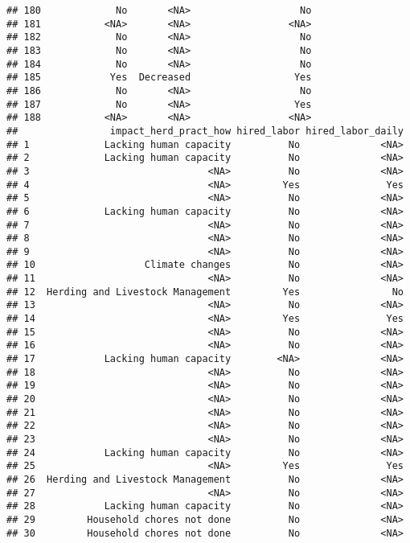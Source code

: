 \documentclass[
]{article}
\begin{document}
\begin{verbatim}
## 180             No       <NA>                   No
## 181           <NA>       <NA>                 <NA>
## 182             No       <NA>                   No
## 183             No       <NA>                   No
## 184             No       <NA>                   No
## 185            Yes  Decreased                  Yes
## 186             No       <NA>                   No
## 187             No       <NA>                  Yes
## 188           <NA>       <NA>                 <NA>
##                impact_herd_pract_how hired_labor hired_labor_daily
## 1             Lacking human capacity          No              <NA>
## 2             Lacking human capacity          No              <NA>
## 3                               <NA>          No              <NA>
## 4                               <NA>         Yes               Yes
## 5                               <NA>          No              <NA>
## 6             Lacking human capacity          No              <NA>
## 7                               <NA>          No              <NA>
## 8                               <NA>          No              <NA>
## 9                               <NA>          No              <NA>
## 10                   Climate changes          No              <NA>
## 11                              <NA>          No              <NA>
## 12  Herding and Livestock Management         Yes                No
## 13                              <NA>          No              <NA>
## 14                              <NA>         Yes               Yes
## 15                              <NA>          No              <NA>
## 16                              <NA>          No              <NA>
## 17            Lacking human capacity        <NA>              <NA>
## 18                              <NA>          No              <NA>
## 19                              <NA>          No              <NA>
## 20                              <NA>          No              <NA>
## 21                              <NA>          No              <NA>
## 22                              <NA>          No              <NA>
## 23                              <NA>          No              <NA>
## 24            Lacking human capacity          No              <NA>
## 25                              <NA>         Yes               Yes
## 26  Herding and Livestock Management          No              <NA>
## 27                              <NA>          No              <NA>
## 28            Lacking human capacity          No              <NA>
## 29         Household chores not done          No              <NA>
## 30         Household chores not done          No              <NA>

\end{verbatim}
\end{document}
